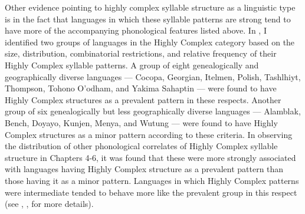   Other evidence pointing to highly complex syllable structure as a linguistic type is in the fact that languages in which these syllable patterns are strong tend to have more of the accompanying phonological features listed above. In , I identified two groups of languages in the Highly Complex category based on the size, distribution, combinatorial restrictions, and relative frequency of their Highly Complex syllable patterns. A group of eight genealogically and geographically diverse languages — Cocopa, Georgian, Itelmen, Polish, Tashlhiyt, Thompson, Tohono O’odham, and Yakima Sahaptin — were found to have Highly Complex structures as a prevalent pattern in these respects. Another group of six genealogically but less geographically diverse languages — Alamblak, Bench, Doyayo, Kunjen, Menya, and Wutung — were found to have Highly Complex structures as a minor pattern according to these criteria. In observing the distribution of other phonological correlates of Highly Complex syllable structure in Chapters 4-6, it was found that these were more strongly associated with languages having Highly Complex structure as a prevalent pattern than those having it as a minor pattern. Languages in which Highly Complex patterns were intermediate tended to behave more like the prevalent group in this respect (see , ,  for more details).



